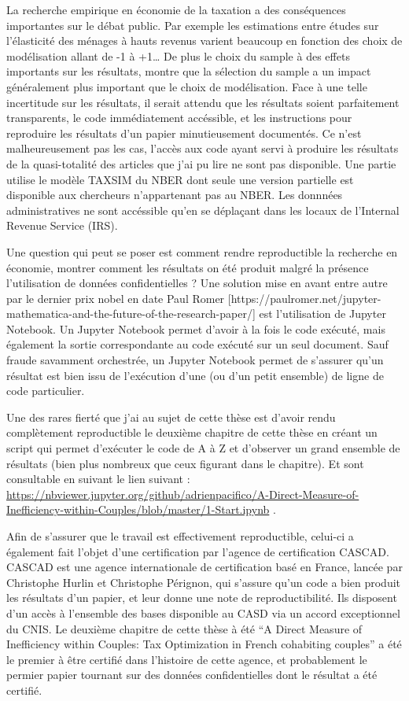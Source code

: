 La recherche empirique en économie de la taxation a des conséquences
importantes sur le débat public. Par exemple les estimations entre
études sur l'élasticité des ménages à hauts revenus varient beaucoup en
fonction des choix de modélisation allant de -1 à +1\ldots{} De plus le
choix du sample à des effets importants sur les résultats, \citet{kopczuk2005tax} montre que la sélection du sample a un impact généralement plus important que
le choix de modélisation. Face à une telle incertitude sur les
résultats, il serait attendu que les résultats soient parfaitement
transparents, le code immédiatement accéssible, et les instructions pour
reproduire les résultats d'un papier minutieusement documentés. Ce n'est
malheureusement pas les cas, l'accès aux code ayant servi à produire les
résultats de la quasi-totalité des articles que j'ai pu lire ne sont pas
disponible. Une partie utilise le modèle TAXSIM du NBER dont seule une
version partielle est disponible aux chercheurs n'appartenant pas au
NBER. Les donnnées administratives ne sont accéssible qu'en se déplaçant
dans les locaux de l'Internal Revenue Service (IRS).

Une question qui peut se poser est comment rendre reproductible la
recherche en économie, montrer comment les résultats on été produit
malgré la présence l'utilisation de données confidentielles ? Une
solution mise en avant entre autre par le dernier prix nobel en date
Paul Romer
{[}https://paulromer.net/jupyter-mathematica-and-the-future-of-the-research-paper/{]}
est l'utilisation de Jupyter Notebook. Un Jupyter Notebook permet
d'avoir à la fois le code exécuté, mais également la sortie
correspondante au code exécuté sur un seul document. Sauf fraude
savamment orchestrée, un Jupyter Notebook permet de s'assurer qu'un
résultat est bien issu de l'exécution d'une (ou d'un petit ensemble) de
ligne de code particulier.

Une des rares fierté que j'ai au sujet de cette thèse est d'avoir rendu
complètement reproductible le deuxième chapitre de cette thèse en créant
un script qui permet d'exécuter le code de A à Z et d'observer un grand
ensemble de résultats (bien plus nombreux que ceux figurant dans le
chapitre). 
\newpage
 Et sont consultable en suivant le lien suivant :
\url{https://nbviewer.jupyter.org/github/adrienpacifico/A-Direct-Measure-of-Inefficiency-within-Couples/blob/master/1-Start.ipynb}
.

Afin de s'assurer que le travail est effectivement reproductible,
celui-ci a également fait l'objet d'une certification par l'agence de
certification CASCAD. CASCAD est une agence internationale de
certification basé en France, lancée par Christophe Hurlin et Christophe
Pérignon, qui s'assure qu'un code a bien produit les résultats d'un
papier, et leur donne une note de reproductibilité. Ils disposent d'un
accès à l'ensemble des bases disponible au CASD via un accord
exceptionnel du CNIS. Le deuxième chapitre de cette thèse à été ``A
Direct Measure of Inefficiency within Couples: Tax Optimization in
French cohabiting couples'' a été le premier à être certifié dans
l'histoire de cette agence, et probablement le permier papier tournant
sur des données confidentielles dont le résultat a été certifié.

